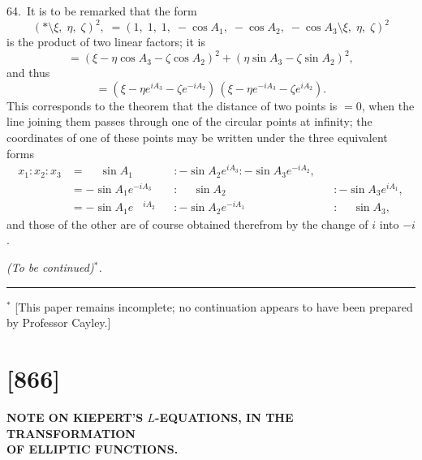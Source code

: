\documentclass[11pt,a4paper]{book}
\begin{document}
64.\ It is to be remarked that the form
\[
(*\!\mathbin{\!\!\setminus\!\!}\xi,\; \eta,\; \zeta)^2,
\; = (1,\; 1,\; 1,\; -\cos A_1,\; -\cos A_2,\; -\cos A_3 \!\mathbin{\!\!\setminus\!\!}\xi,\; \eta,\; \zeta)^2
\]
is the product of two linear factors; it is
\[
= (\xi - \eta \cos A_3 - \zeta \cos A_2)^2 + (\eta \sin A_3 - \zeta \sin A_2)^2,
\]
and thus
\[
= (\xi - \eta e^{iA_3} - \zeta e^{-iA_2})\,
(\xi - \eta e^{-iA_3} - \zeta e^{iA_2}).
\]
This corresponds to the theorem that the distance of two points is $= 0$, when the line
joining them passes through one of the circular points at infinity; the coordinates of
one of these points may be written under the three equivalent forms
\begin{align*}
x_1 : x_2 : x_3 &= \phantom{-}\sin A_1 && : -\sin A_2 e^{iA_3} : -\sin A_3 e^{-iA_2},\\
&= -\sin A_1 e^{-iA_3} && : \phantom{-}\sin A_2 && : -\sin A_3 e^{iA_1},\\
&= -\sin A_1 e^{\phantom{-}iA_2} && : -\sin A_2 e^{-iA_1} && : \phantom{-}\sin A_3,
\end{align*}
and those of the other are of course obtained therefrom by the change of $i$ into $-i$.

\begin{flushright}
\textit{(To be continued)$^*$.}
\end{flushright}

\vspace{1em}
\noindent\rule{0.4\textwidth}{0.4pt}

\smallskip
\noindent $^*$ [This paper remains incomplete; no continuation appears to have been prepared by Professor Cayley.]

\newpage
\section*{[866]}
\begin{center}
\large\textbf{NOTE ON KIEPERT'S $L$-EQUATIONS, IN THE TRANSFORMATION\\OF ELLIPTIC FUNCTIONS.}
\end{center}

\begin{flushright}
\end{flushright}
\end{document}
